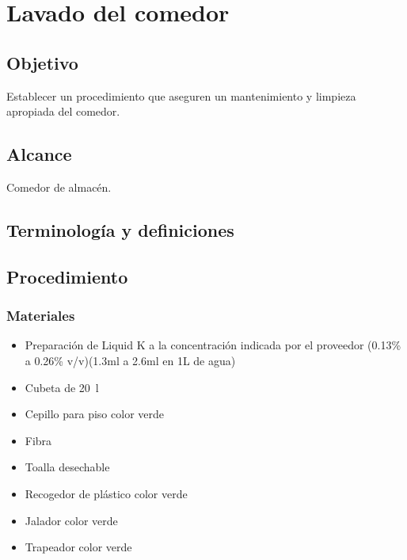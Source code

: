 \renewcommand{\MenorVer}{0}
\renewcommand{\MayorVer}{2}
\renewcommand{\Codigo}{HYS-17-IT}
\renewcommand{\FechaPub}{2023--01}
\renewcommand{\Titulo}{Lavado del comedor}

\section{\Titulo}

\subsection{Objetivo}

Establecer un procedimiento que aseguren un mantenimiento y limpieza apropiada del comedor.

\subsection{Alcance}

Comedor de almacén.

\subsection{Terminología y definiciones}

\begin{description}
\end{description}



\subsection{Procedimiento}

\subsubsection{Materiales}

\begin{itemize}
	\item Preparación de Liquid K a la concentración indicada por el proveedor (0.13\% a 0.26\% v/v)(1.3ml a 2.6ml en 1L de agua)
	\item Cubeta de \qty{20}{\litre}
	\item Cepillo para piso color verde
	\item Fibra
	\item Toalla desechable
	\item Recogedor de plástico color verde
	\item Jalador color verde
	\item Trapeador color verde
\end{itemize}

